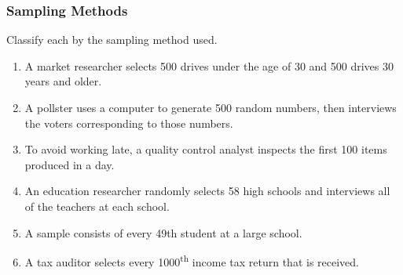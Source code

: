 \documentclass{article}
\newcounter{pset}
\begin{document}
\subsubsection*{Sampling Methods}

Classify each by the sampling method used.
\begin{enumerate} \setcounter{enumi}{\value{pset}}
    \item A market researcher selects 500 drives under the age of 30 and 500 drives 30 years and older.
    \item A pollster uses a computer to generate 500 random numbers, then interviews the voters corresponding to those numbers.
    \item To avoid working late, a quality control analyst inspects the first 100 items produced in a day.
    \item An education researcher randomly selects 58 high schools and interviews all of the teachers at each school.
    \item A sample consists of every 49th student at a large school.
    \item A tax auditor selects every 1000\textsuperscript{th} income tax return that is received.
\end{enumerate}     \setcounter{pset}{\value{enumi}}

\newpage 
\end{document}
